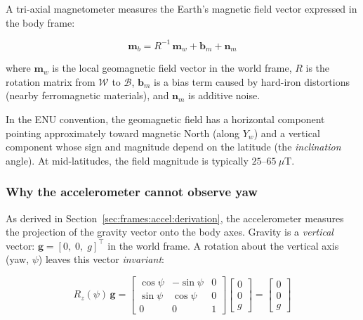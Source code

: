 A tri-axial magnetometer measures the Earth's magnetic field vector expressed
in the body frame:

\begin{equation}
  \mathbf{m}_b = R^{-1}\,\mathbf{m}_w + \mathbf{b}_m + \mathbf{n}_m
  \label{eq:mag_model}
\end{equation}

\noindent where $\mathbf{m}_w$ is the local geomagnetic field vector in the
world frame, $R$ is the rotation matrix from $\mathcal{W}$ to $\mathcal{B}$,
$\mathbf{b}_m$ is a bias term caused by hard-iron distortions (nearby
ferromagnetic materials), and $\mathbf{n}_m$ is additive noise.

In the ENU convention, the geomagnetic field has a horizontal component
pointing approximately toward magnetic North (along $Y_w$) and a vertical
component whose sign and magnitude depend on the latitude (the
\emph{inclination} angle). At mid-latitudes, the field magnitude is typically
$25$--$65~\mu$T.

\subsubsection{Why the accelerometer cannot observe yaw}
\label{sec:frames:mag:why}

As derived in Section~\ref{sec:frames:accel:derivation}, the accelerometer
measures the projection of the gravity vector onto the body axes. Gravity is
a \emph{vertical} vector: $\mathbf{g} = [0,\;0,\;g]^\top$ in the world
frame. A rotation about the vertical axis (yaw, $\psi$) leaves this vector
\emph{invariant}:

\begin{equation}
  R_z(\psi)\,\mathbf{g}
  = \begin{bmatrix}
      \cos\psi & -\sin\psi & 0 \\
      \sin\psi & \cos\psi  & 0 \\
      0        & 0         & 1
    \end{bmatrix}
  \begin{bmatrix} 0 \\ 0 \\ g \end{bmatrix}
  = \begin{bmatrix} 0 \\ 0 \\ g \end{bmatrix}
  \label{eq:yaw_gravity_invariant}
\end{equation}

